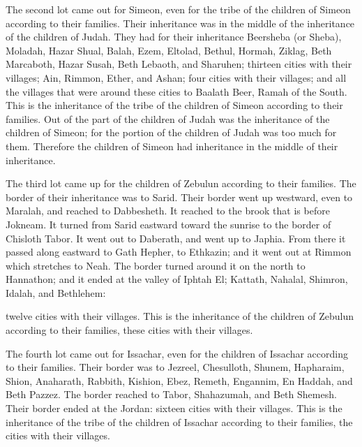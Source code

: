 \mychapter{} \myverse*{}The second lot came out for Simeon, even for the tribe of the
children of Simeon according to their families. Their inheritance was in the middle of the inheritance
of the children of Judah.
\myverse{}They had for their inheritance Beersheba (or Sheba), Moladah,
\myverse{}Hazar Shual, Balah, Ezem,
\myverse{}Eltolad, Bethul, Hormah,
\myverse{}Ziklag, Beth Marcaboth, Hazar Susah,
\myverse{}Beth Lebaoth, and Sharuhen; thirteen cities with their villages;
\myverse{}Ain, Rimmon, Ether, and Ashan; four cities with their villages;
\myverse{}and all the villages that were around these cities to Baalath Beer, Ramah of
the South. This is the inheritance of the tribe of the children of Simeon according to their families.
\myverse{}Out of the part of the children of Judah was the inheritance of the children
of Simeon; for the portion of the children of Judah was too much for them. Therefore the children of Simeon
had inheritance in the middle of their inheritance.

\myverse{}The third lot came up for the children of Zebulun according
to their families. The border of their inheritance was to Sarid.
\myverse{}Their border went up westward, even to Maralah, and reached to Dabbesheth.
It reached to the brook that is before Jokneam.
\myverse{}It turned from Sarid eastward toward the sunrise to the border of Chisloth
Tabor. It went out to Daberath, and went up to Japhia.
\myverse{}From there it passed along eastward to Gath Hepher, to Ethkazin; and it went
out at Rimmon which stretches to Neah.
\myverse{}The border turned around it on the north to Hannathon; and it ended at the
valley of Iphtah El;
\myverse{}Kattath, Nahalal, Shimron, Idalah, and Bethlehem: 



\noindent twelve cities with their
villages.
\myverse{}This is the inheritance of the children of Zebulun according to their families,
these cities with their villages.

\myverse{}The fourth lot came out for Issachar, even for the children
of Issachar according to their families.
\myverse{}Their border was to Jezreel, Chesulloth, Shunem,
\myverse{}Hapharaim, Shion, Anaharath,
\myverse{}Rabbith, Kishion, Ebez,
\myverse{}Remeth, Engannim, En Haddah, and Beth Pazzez.
\myverse{}The border reached to Tabor, Shahazumah, and Beth Shemesh. Their border ended
at the Jordan: sixteen cities with their villages.
\myverse{}This is the inheritance of the tribe of the children of Issachar according
to their families, the cities with their villages.

